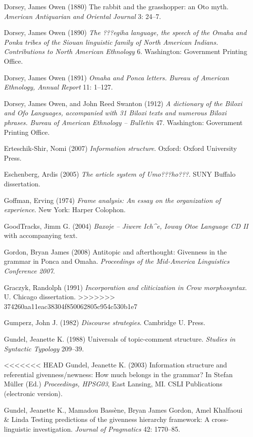 \documentclass[output=paper]{LSP/langsci}
\begin{document}
\begin{reflist}
\begin{reflist}
Dorsey, James Owen (1880) The rabbit and the grasshopper: an Oto myth. \emph{American Antiquarian and Oriental Journal} 3: 24--7.

Dorsey, James Owen (1890) \emph{The ???egiha language, the speech of the Omaha and Ponka tribes of the Siouan linguistic family of North American Indians. Contributions to North American Ethnology} 6. Washington: Government Printing Office.

Dorsey, James Owen (1891) \emph{Omaha and Ponca letters. Bureau of American Ethnology, Annual Report} 11: 1--127.

Dorsey, James Owen, and John Reed Swanton (1912) \emph{A dictionary of the Biloxi and Ofo Languages, accompanied with 31 Biloxi texts and numerous Biloxi phrases. Bureau of American Ethnology -- Bulletin} 47. Washington: Government Printing Office.

Erteschik-Shir, Nomi (2007) \emph{Information structure}. Oxford: Oxford University Press.

Eschenberg, Ardis (2005) \emph{The article system of Umo???ho???}. SUNY Buffalo dissertation.

Goffman, Erving (1974) \emph{Frame analysis: An essay on the organization of experience}. New York: Harper Colophon.

GoodTracks, Jimm G. (2004) \emph{Baxoje -- Jiwere Ich\^{}e, Ioway Otoe Language CD II} with accompanying text.

Gordon, Bryan James (2008) Antitopic and afterthought: Givenness in the grammar in Ponca and Omaha. \emph{Proceedings of the Mid-America Linguistics Conference 2007}.

Graczyk, Randolph (1991) \emph{Incorporation and cliticization in Crow morphosyntax}. U. Chicago dissertation.
>>>>>>> 374260aa11eac38304f850062805c954c530b1e7

Gumperz, John J. (1982) \emph{Discourse strategies}. Cambridge U. Press.

Gundel, Jeanette K. (1988) Universals of topic-comment structure. \emph{Studies in Syntactic Typology} 209--39.

<<<<<<< HEAD
Gundel, Jeanette K. (2003) Information structure and referential givenness/newness: How much belongs in the grammar? In Stefan Müller (Ed.) \emph{Proceedings, HPSG03}, East Lansing, MI. CSLI Publications (electronic version).

Gundel, Jeanette K., Mamadou Bassène, Bryan James Gordon, Amel Khalfaoui \& Linda \citet{Humnick2010} Testing predictions of the givenness hierarchy framework: A cross-linguistic investigation. \emph{Journal of Pragmatics} 42: 1770--85.


\end{reflist}
\end{reflist}
\end{document}
